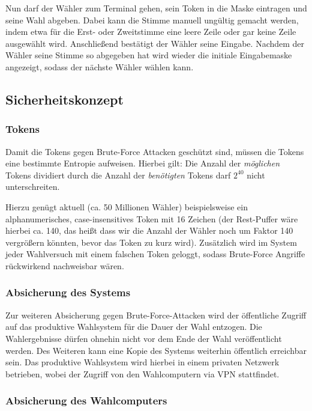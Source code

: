\documentclass[a4paper]{scrreprt}
\begin{document}
Nun darf der Wähler zum Terminal gehen, sein Token in die Maske eintragen und seine Wahl abgeben. Dabei kann die Stimme manuell ungültig gemacht werden, indem etwa für die Erst- oder Zweitstimme eine leere Zeile oder gar keine Zeile ausgewählt wird.
Anschließend bestätigt der Wähler seine Eingabe. Nachdem der Wähler seine Stimme so abgegeben hat wird wieder die initiale Eingabemaske angezeigt, sodass der nächste Wähler wählen kann.

\subsection{Sicherheitskonzept}

\subsubsection{Tokens}

Damit die Tokens gegen Brute-Force Attacken geschützt sind, müssen die Tokens eine bestimmte Entropie aufweisen.
Hierbei gilt: Die Anzahl der \textit{möglichen} Tokens dividiert durch die Anzahl der \textit{benötigten} Tokens darf $2^{40}$ nicht unterschreiten.

Hierzu genügt aktuell (ca. 50 Millionen Wähler) beispielsweise ein alphanumerisches, case-insensitives Token mit 16 Zeichen (der Rest-Puffer wäre hierbei ca. 140, das heißt dass wir die Anzahl der Wähler noch um Faktor 140 vergrößern könnten, bevor das Token zu kurz wird).
Zusätzlich wird im System jeder Wahlversuch mit einem falschen Token geloggt, sodass Brute-Force Angriffe rückwirkend nachweisbar wären.

\subsubsection{Absicherung des Systems}

Zur weiteren Absicherung gegen Brute-Force-Attacken wird der öffentliche Zugriff auf das produktive Wahlsystem für die Dauer der Wahl entzogen. Die Wahlergebnisse dürfen ohnehin nicht vor dem Ende der Wahl veröffentlicht werden. Des Weiteren kann eine Kopie des Systems weiterhin öffentlich erreichbar sein. Das produktive Wahlsystem wird hierbei in einem privaten Netzwerk betrieben, wobei der Zugriff von den Wahlcomputern via VPN stattfindet.

\subsubsection{Absicherung des Wahlcomputers}
\end{document}
